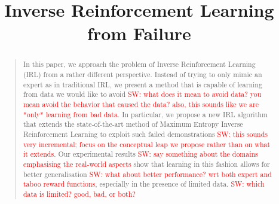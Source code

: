 \documentclass[letterpaper]{article}
\newcommand{\sw}[1]{\textcolor{red}{SW: #1}}
\newcommand{\sw}[1]{}
\begin{document}
%
\title{Inverse Reinforcement Learning from Failure}
\maketitle
\begin{abstract}
\begin{quote}
In this paper, we approach the problem of Inverse Reinforcement Learning (IRL) from a rather different perspective. Instead of trying to only mimic an expert as in traditional IRL, we present a method that is capable of learning from data we would like to avoid \sw{what does it mean to avoid data? you mean avoid the behavior that caused the data? also, this sounds like we are *only* learning from bad data}. In particular, we propose a new IRL algorithm that extends the state-of-the-art method of Maximum Entropy Inverse Reinforcement Learning to exploit such failed demonstrations \sw{this sounds very incremental; focus on the conceptual leap we propose rather than on what it extends}. Our experimental results \sw{say something about the domains emphasising the real-world aspects} show that learning in this fashion allows for better generalisation \sw{what about better performance? wrt both expert and taboo reward functions}, especially in the presence of limited data. \sw{which data is limited? good, bad, or both?}
\end{quote}
\end{abstract}
\end{document}
